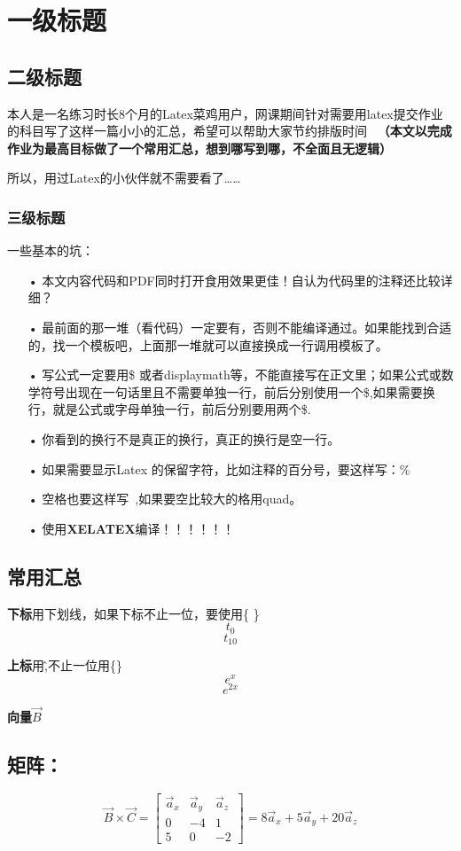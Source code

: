 \documentclass[UTF8]{ctexart}
\begin{document}
  
\section{一级标题}
\subsection{二级标题}
本人是一名练习时长8个月的Latex菜鸡用户，网课期间针对需要用latex提交作业的科目写了这样一篇小小的汇总，希望可以帮助大家节约排版时间~
\textbf{（本文以完成作业为最高目标做了一个常用汇总，想到哪写到哪，不全面且无逻辑）}

所以，用过Latex的小伙伴就不需要看了……
\subsubsection{三级标题}
一些基本的坑：
\begin{enumerate}
\item[•]本文内容代码和PDF同时打开食用效果更佳！自认为代码里的注释还比较详细？
\item[•]最前面的那一堆（看代码）一定要有，否则不能编译通过。如果能找到合适的，找一个模板吧，上面那一堆就可以直接换成一行调用模板了。
\item[•]写公式一定要用\$ 或者displaymath等，不能直接写在正文里；如果公式或数学符号出现在一句话里且不需要单独一行，前后分别使用一个\$,如果需要换行，就是公式或字母单独一行，前后分别要用两个\$.
\item[•] 你看到的换行不是真正的换行，真正的换行是空一行。
\item[•]如果需要显示Latex 的保留字符，比如注释的百分号，要这样写：\%
\item[•]空格也要这样写\ ,如果要空比较大的格\quad 用quad。
\item[•]使用\textbf{XELATEX}编译！！！！！！
\end{enumerate}
\subsection{常用汇总}
\textbf{下标}用下划线，如果下标不止一位，要使用\{ \}
$$t_0$$
$$t_{10}$$

\textbf{上标}用\^,不止一位用\{\}
$$e^x$$
$$e^{2x}$$


\textbf{向量}$\vec{B}$

\subsection{矩阵：} 
\begin{displaymath}
\vec{B}\times\vec{C}= \left[
\begin{matrix}
   \vec{a}_x & \vec{a}_y & \vec{a}_z \\
   0 & -4 & 1 \\
   5 & 0 & -2
\end{matrix}
\right] =8\vec{a}_x+5\vec{a}_y+20\vec{a}_z
\end{displaymath}
\end{document}
